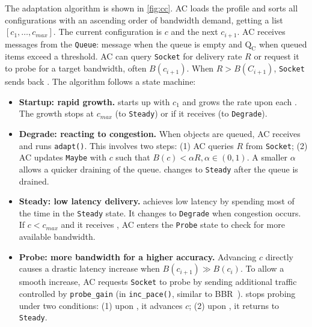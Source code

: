 The adaptation algorithm is shown in \autoref{fig:cc}. AC loads the profile and
sorts all configurations with an ascending order of bandwidth demand, getting a
list $[c_1, \dots, c_{max}]$. The current configuration is $c$ and the next
$c_{i+1}$. AC receives messages from the \texttt{Queue}: message \qe{} when the
queue is empty and $\text{Q}_\text{C}$ when queued items exceed a threshold. AC
can query \texttt{Socket} for delivery rate $R$ or request it to probe for a
target bandwidth, often $B(c_{i+1})$. When $R > B(C_{i+1})$, \texttt{Socket}
sends back \spd{}. The algorithm follows a state machine:

\begin{itemize}[leftmargin=*]

\item \textbf{Startup: rapid growth.} \sysname{} starts up with $c_1$ and grows
  the rate upon each \qe{}. The growth stops at $c_{max}$ (to \texttt{Steady})
  or if it receives \qc{} (to \texttt{Degrade}).

\item \textbf{Degrade: reacting to congestion.} When objects are queued, AC
  receives \qc{} and runs \texttt{adapt()}. This involves two steps: (1) AC
  queries $R$ from \texttt{Socket}; (2) AC updates \texttt{Maybe} with $c$ such
  that $B(c) < \alpha R, \alpha \in (0, 1)$. A smaller $\alpha$ allows a quicker
  draining of the queue. \sysname{} changes to \texttt{Steady} after the queue
  is drained.

\item \textbf{Steady: low latency delivery.} \sysname{} achieves low latency by
  spending most of the time in the \texttt{Steady} state. It changes to
  \texttt{Degrade} when congestion occurs. If $c < c_{max}$ and it receives
  \qe{}, AC enters the \texttt{Probe} state to check for more available
  bandwidth.

\item \textbf{Probe: more bandwidth for a higher accuracy.} Advancing $c$
  directly causes a drastic latency increase when $B(c_{i+1}) \gg B(c_i)$. To
  allow a smooth increase, AC requests \texttt{Socket} to probe by sending
  additional traffic controlled by \texttt{probe\_gain} (in
  \texttt{inc\_pace()}, similar to BBR~\cite{cardwell2017bbr}). \sysname{} stops
  probing under two conditions: (1) upon \spd{}, it advances $c$; (2) upon
  \qc{}, it returns to \texttt{Steady}.

\end{itemize}

